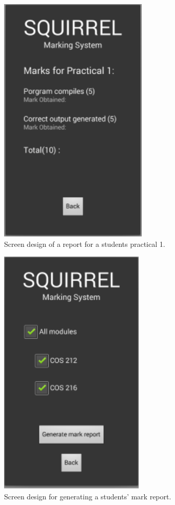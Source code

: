 \documentclass[12pt]{article}
\begin{document}
	\clearpage
	\pagebreak
		\begin{figure}[htbp]
		\centering
		\includegraphics[width=0.7\linewidth, height=12cm]{./Diagrams/mobile_pracMarksheet}
		\caption{Screen design of a report for a students practical 1.}
		\label{fig:mobile_pracMarksheet}
		\end{figure}
	\pagebreak		
		\begin{figure}[htbp]
		\centering
		\includegraphics[width=0.7\linewidth, height=12cm]{./Diagrams/mobile_studentReport}
		\caption{Screen design for generating a students' mark report. }
		\label{fig:mobile_studentReport}
		\end{figure}	
	\pagebreak	
\end{document}
